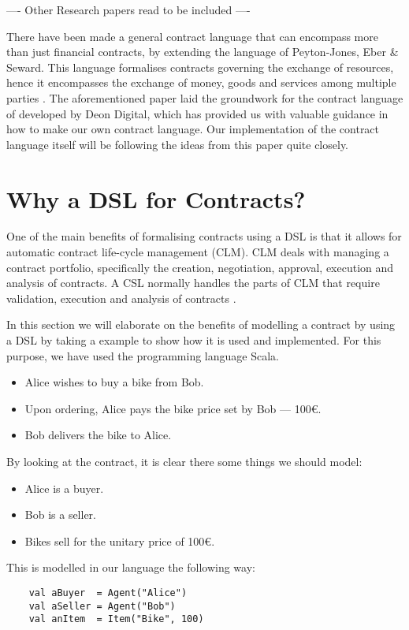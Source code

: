 \documentclass{ituthesis}
\begin{document}
---- Other Research papers read to be included ----

There have been made a general contract language that can encompass more than just financial contracts, by extending the language of Peyton-Jones, Eber \& Seward. This language formalises contracts governing the exchange of resources, hence it encompasses the exchange of money, goods and services among multiple parties \cite{andersen2006compositional}. The aforementioned paper laid the groundwork for the contract language of developed by Deon Digital, which has provided us with valuable guidance in how to make our own contract language. Our implementation of the contract language itself will be following the ideas from this paper quite closely.

\section{Why a DSL for Contracts?}
One of the main benefits of formalising contracts using a DSL is that it allows for automatic contract life-cycle management (CLM). CLM deals with managing a contract portfolio, specifically the creation, negotiation, approval, execution and analysis of contracts. A CSL normally handles the parts of CLM that require validation, execution and analysis of contracts \cite{hvitved2011contract}.

In this section we will elaborate on the benefits of modelling a contract by using a DSL by taking a example to show how it is used and implemented. For this purpose, we have used the programming language Scala. %

\begin{tcolorbox}
\begin{itemize}
    \item Alice wishes to buy a bike from Bob.
    \item Upon ordering, Alice pays the bike price set by Bob --- 100€.
    \item Bob delivers the bike to Alice.
\end{itemize}
\end{tcolorbox}

By looking at the contract, it is clear there some things we should model:
\begin{itemize}
    \item Alice is a buyer.
    \item Bob is a seller.
    \item Bikes sell for the unitary price of 100€.
\end{itemize}
This is modelled in our language the following way:
\begin{lstlisting}
	val aBuyer	= Agent("Alice")
	val aSeller	= Agent("Bob")
	val anItem	= Item("Bike", 100)
\end{lstlisting}
\end{document}
